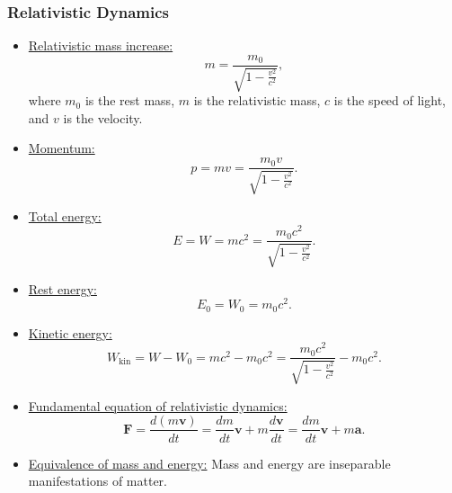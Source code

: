 \documentclass[t,aspectratio=169]{beamer}
\begin{document}

\begin{frame}
\frametitle{Relativistic Dynamics}
\begin{itemize}
\setlength{\parskip}{0pt}
\setlength{\itemsep}{0pt}
\item \underline{Relativistic mass increase:}  
$$m=\frac{m_{0}}{\sqrt{1-\frac{v^{2}}{c^{2}}}},$$  
where $m_{0}$ is the rest mass, $m$ is the relativistic mass, $c$ is the speed of light, and $v$ is the velocity.
\item \underline{Momentum:}  
$$p = m v = \frac{m_{0}v}{\sqrt{1-\frac{v^{2}}{c^{2}}}}.$$
\item \underline{Total energy:}  
$$E = W = m c^{2} = \frac{m_{0} c^{2}}{\sqrt{1-\frac{v^{2}}{c^{2}}}}.$$
\pagebreak
\item \underline{Rest energy:}  
$$E_{0} = W_{0} = m_{0}c^{2}.$$
\item \underline{Kinetic energy:}  
$$W_{\text{kin}} = W - W_{0} = m c^{2} - m_{0} c^{2} = \frac{m_{0} c^{2}}{\sqrt{1-\frac{v^{2}}{c^{2}}}} - m_{0} c^{2}.$$
\item \underline{Fundamental equation of relativistic dynamics:}  
  $$\mathbf{F} = \frac{d\left(m\mathbf{v}\right)}{dt}=\frac{dm}{dt}\mathbf{v}+m\frac{d\mathbf{v}}{dt}=\frac{dm}{dt}\mathbf{v}+m\mathbf{a}.$$
\pagebreak
\item \underline{Equivalence of mass and energy:}  Mass and energy are inseparable manifestations of matter.
\end{itemize}
\end{frame}

\end{document}

